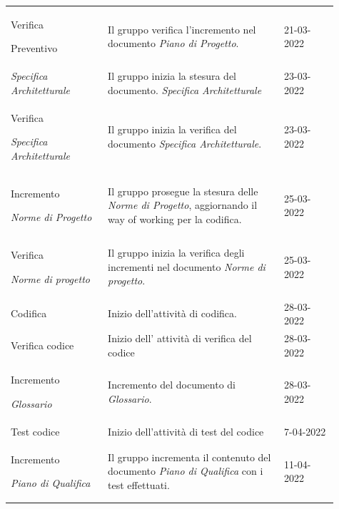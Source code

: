 {\begin{longtable}{p{0.27\linewidth}p{0.49\linewidth}p{0.15\linewidth}}
    \rowcolor[RGB]{216, 235, 171}
    Verifica \par Preventivo & Il gruppo verifica l'incremento nel documento \textit{Piano di Progetto}. & 21-03-2022\\

    \rowcolor[RGB]{233, 245, 206}
    \textit{Specifica Architetturale} & Il gruppo inizia la stesura del documento. \textit{Specifica Architetturale} & 23-03-2022\\

    \rowcolor[RGB]{216, 235, 171}
    Verifica \par \textit{Specifica Architetturale} & Il gruppo inizia la verifica del documento \textit{Specifica Architetturale}. & 23-03-2022\\

    \rowcolor[RGB]{233, 245, 206} 
    Incremento \par \textit{Norme di Progetto} & Il gruppo prosegue la stesura delle \textit{Norme di Progetto}, aggiornando il way of working per la codifica. & 25-03-2022\\

    \rowcolor[RGB]{216, 235, 171} 
    Verifica \par \textit{Norme di progetto} & Il gruppo inizia la verifica degli incrementi nel documento \textit{Norme di progetto}. & 25-03-2022\\

    \rowcolor[RGB]{233, 245, 206}
    Codifica & Inizio dell'attività di codifica. &  28-03-2022\\
    
    \rowcolor[RGB]{216, 235, 171} 
    Verifica codice & Inizio dell' attività di verifica del codice & 28-03-2022\\

    \rowcolor[RGB]{233, 245, 206}
    Incremento \par \textit{Glossario} & Incremento del documento di \textit{Glossario}. & 28-03-2022\\

    \rowcolor[RGB]{216, 235, 171} 
    Test codice & Inizio dell'attività di test del codice & 7-04-2022\\

    \rowcolor[RGB]{233, 245, 206}
    Incremento \par \textit{Piano di Qualifica} & Il gruppo incrementa il contenuto del documento \textit{Piano di Qualifica} con i test effettuati. & 11-04-2022\\
    

\end{longtable}}
